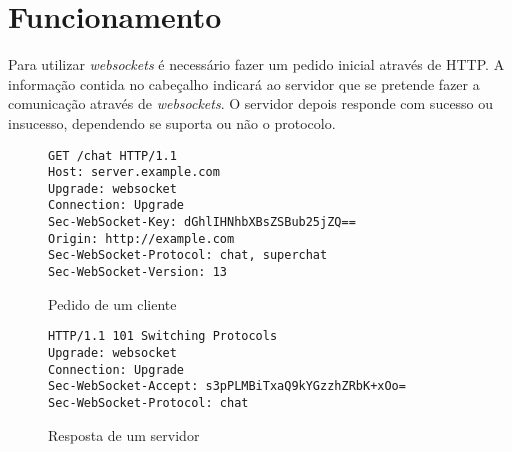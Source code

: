 \documentclass[a4paper]{article}
\begin{document}
\section{Funcionamento}

Para utilizar \emph{websockets} é necessário fazer um pedido inicial através de HTTP. A informação contida no cabeçalho indicará ao servidor que se pretende fazer a comunicação através de \emph{websockets}. O servidor depois responde com sucesso ou insucesso, dependendo se suporta ou não o protocolo.

\begin{figure}
	\begin{framed}
		\texttt{\small GET /chat HTTP/1.1 \\
						Host: server.example.com \\
						Upgrade: websocket\\
						Connection: Upgrade\\
						Sec-WebSocket-Key: dGhlIHNhbXBsZSBub25jZQ==\\
						Origin: http://example.com\\
						Sec-WebSocket-Protocol: chat, superchat\\
						Sec-WebSocket-Version: 13\\
		}		
	\end{framed}
	\caption{Pedido de um cliente}
  \label{fig:httpHeaderReq}
\end{figure}

\begin{figure}
	\begin{framed}
		\texttt{\small HTTP/1.1 101 Switching Protocols\\
					Upgrade: websocket\\
					Connection: Upgrade\\
					Sec-WebSocket-Accept: s3pPLMBiTxaQ9kYGzzhZRbK+xOo=\\
					Sec-WebSocket-Protocol: chat\\
		}
	\end{framed}
		\caption{Resposta de um servidor}
  \label{fig:httpHeaderRspS}
\end{figure}
\end{document}
